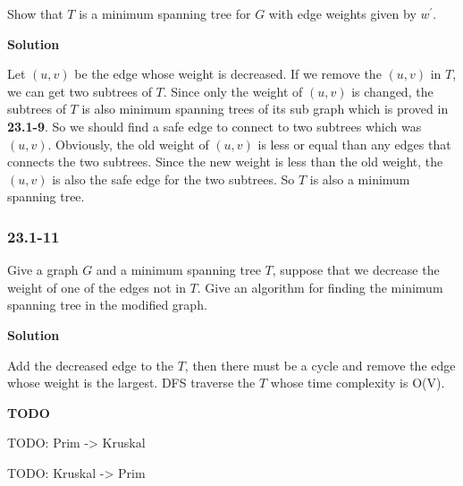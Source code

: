 Show that $T$ is a minimum spanning tree for $G$ with edge weights given by
$w^{'}$.

\textbf{Solution}

Let $(u, v)$ be the edge whose weight is decreased. If we remove the $(u, v)$ in
$T$, we can get two subtrees of $T$. Since only the weight of $(u, v)$ is
changed, the subtrees of $T$ is also minimum spanning trees of its sub graph
which is proved in \textbf{23.1-9}. So we should find a safe edge to connect
to two subtrees which was $(u, v)$. Obviously, the old weight of $(u, v)$ is
less or equal than any edges that connects the two subtrees. Since the new
weight is less than the old weight, the $(u, v)$ is also the safe edge for the
two subtrees. So $T$ is also a minimum spanning tree.


\subsubsection{23.1-11}

Give a graph $G$ and a minimum spanning tree $T$, suppose that we decrease the
weight of one of the edges not in $T$. Give an algorithm for finding the minimum
spanning tree in the modified graph.

\textbf{Solution}

Add the decreased edge to the $T$, then there must be a cycle and remove the
edge whose weight is the largest. DFS traverse the $T$ whose time complexity is
O(V).



\textbf{TODO}

TODO: Prim -> Kruskal

TODO: Kruskal -> Prim
